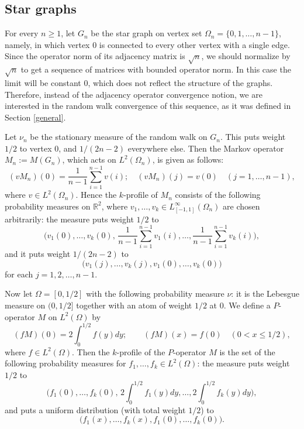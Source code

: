 \documentclass[a4wider]{amsart}
\theoremstyle{definitionbreak}\newtheorem{D}[theorem]{Definition}
\theoremstyle{definitionbreak}\newtheorem*{D*}{Definition}
\begin{document}
\medskip

\subsection{Star graphs}

For every $n\geq 1$, let $G_n$ be the star graph on vertex set $\Omega_n=\{0, 1, \ldots, n-1\}$, namely, in which vertex $0$ is connected to every other vertex with a single edge. Since the operator norm of its adjacency matrix is $\sqrt n$, we should normalize by $\sqrt n$ to get a sequence of matrices with bounded operator norm.  In this case the limit will be constant $0$, which does not reflect the structure of the graphs. Therefore, instead of the adjacency operator  convergence notion, we are interested in the random walk convergence of this sequence, as it was defined in Section \ref{general}. 

Let $\nu_n$ be the stationary measure of the random walk on $G_n$. This puts weight $1/2$ to vertex $0$, and $1/(2n-2)$ everywhere else. Then the Markov operator $M_n:=M(G_n)$, which acts on $L^2(\Omega_n)$, is given as follows:
\[(vM_n)(0)=\frac{1}{n-1}\sum_{i=1}^{n-1} v(i); \quad (vM_n)(j)=v(0) \quad (j=1, \ldots, n-1),\]
where $v\in L^2(\Omega_n)$. Hence the $k$-profile of $M_n$ consists of the following probability measures on $\mathbb R^2$, where $v_1, \ldots, v_k\in L^\infty_{[-1,1]}(\Omega_n)$ are chosen arbitrarily: the measure puts weight $1/2$ to 
\[\bigg(v_1(0), \ldots, v_k(0),\, \frac{1}{n-1}\sum_{i=1}^{n-1} v_1(i), \ldots, \frac{1}{n-1}\sum_{i=1}^{n-1} v_k(i)\bigg),\]
and it puts weight $1/(2n-2)$ to 
\[\big(v_1(j), \ldots, v_k(j), v_1(0), \ldots, v_k(0)\big)\]
for each $j=1, 2, \ldots, n-1$. 

Now let $\Omega=[0,1/2]$ with the following probability measure $\nu$: it is the Lebesgue measure on $(0,1/2]$ together with an atom of weight $1/2$ at $0$. We define a $P$-operator $M$ on $L^2(\Omega)$ by 
\[(fM)(0)=2\int_{0}^{1/2} f(y) dy; \qquad (fM)(x)=f(0) \quad (0<x\leq 1/2),\]
where $f\in L^2(\Omega)$. 
Then the $k$-profile of the $P$-operator $M$ is the set of the following probability measures for $f_1, \ldots, f_k\in L^2(\Omega)$: the measure puts weight $1/2$ to 
\[\bigg(f_1(0), \ldots, f_k(0),\, 2\int_0^{1/2} f_1(y)dy, \ldots, 2\int_0^{1/2} f_k(y)dy\bigg),\]
and puts a uniform distribution (with total weight $1/2$) to 
\[\big(f_1(x), \ldots, f_k(x), f_1(0), \ldots, f_k(0)\big).\]
\end{document}
